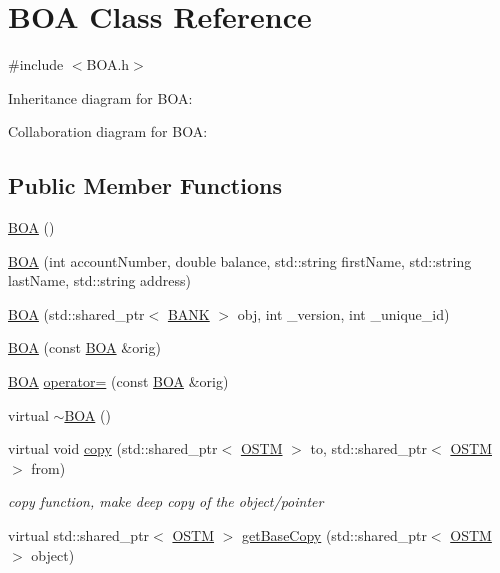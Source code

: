 \hypertarget{class_b_o_a}{}\section{B\+OA Class Reference}
\label{class_b_o_a}


{\ttfamily \#include $<$B\+O\+A.\+h$>$}



Inheritance diagram for B\+OA\+:


Collaboration diagram for B\+OA\+:
\subsection*{Public Member Functions}
\begin{DoxyCompactItemize}
\item 
\hyperlink{class_b_o_a_ad42dc670d422172c9bcf9b3d354c8a3c}{B\+OA} ()
\item 
\hyperlink{class_b_o_a_a898c8627b8976bbe1a7d0fc780642b25}{B\+OA} (int account\+Number, double balance, std\+::string first\+Name, std\+::string last\+Name, std\+::string address)
\item 
\hyperlink{class_b_o_a_ab87192ed986e601c2eb682ea3745daf0}{B\+OA} (std\+::shared\+\_\+ptr$<$ \hyperlink{class_b_a_n_k}{B\+A\+NK} $>$ obj, int \+\_\+version, int \+\_\+unique\+\_\+id)
\item 
\hyperlink{class_b_o_a_a99ebf22a8d824761dc82e7e191e6f173}{B\+OA} (const \hyperlink{class_b_o_a}{B\+OA} \&orig)
\item 
\hyperlink{class_b_o_a}{B\+OA} \hyperlink{class_b_o_a_af24b66f0e072b29abbbe5812cab48369}{operator=} (const \hyperlink{class_b_o_a}{B\+OA} \&orig)
\item 
virtual \hyperlink{class_b_o_a_abe27b17a23ceffc6269dbe6d81de5212}{$\sim$\+B\+OA} ()
\item 
virtual void \hyperlink{class_b_o_a_a54fbcabb55b22fb72f45986768974403}{copy} (std\+::shared\+\_\+ptr$<$ \hyperlink{class_o_s_t_m}{O\+S\+TM} $>$ to, std\+::shared\+\_\+ptr$<$ \hyperlink{class_o_s_t_m}{O\+S\+TM} $>$ from)
\begin{DoxyCompactList}\small\item\em copy function, make deep copy of the object/pointer \end{DoxyCompactList}\item 
virtual std\+::shared\+\_\+ptr$<$ \hyperlink{class_o_s_t_m}{O\+S\+TM} $>$ \hyperlink{class_b_o_a_a46ace5d3c945a423e93912673cadfad5}{get\+Base\+Copy} (std\+::shared\+\_\+ptr$<$ \hyperlink{class_o_s_t_m}{O\+S\+TM} $>$ object)

\end{DoxyCompactItemize}
